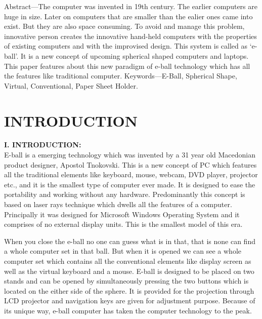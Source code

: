 \documentclass{article}
\begin{document}
Abstract—The computer was invented in 19th century. The earlier computers are huge in size. Later on computers that are smaller than the ealier ones came into exist. But they are also space consuming. To avoid and manage this problem, innovative person creates the innovative hand-held computers with the properties of existing computers and with the improvised design.  This system is called as ‘e-ball’. It is a new concept of upcoming spherical shaped computers and laptops. This paper features about this new paradigm of e-ball technology which has all the features like traditional computer. Keywords—E-Ball, Spherical Shape, Virtual, Conventional, Paper Sheet Holder.\\

\newpage
\section{INTRODUCTION}
 
\textbf{I. INTRODUCTION: }\\


E-ball is  a emerging  technology which was invented 
by  a  31  year  old  Macedonian  product  designer,  Apostol 
Tnokovski. This is a new concept of PC which features all the 
traditional  elements  like  keyboard,  mouse,  webcam,  DVD 
player, projector  etc., and  it is the  smallest type  of computer 
ever made. It  is designed  to ease  the portability  and working 
without any hardware. Predominantly this concept is based on 
laser rays technique which dwells all the features of a computer. 
Principally it was  designed for  Microsoft Windows Operating 
System and it comprises of no external display units. This is the 
smallest model of this era.
 
When you close the e-ball no one can guess what is in 
that, that is none can find a whole computer set in that ball. But 
when  it  is  opened  we  can  see  a  whole  computer  set  which 
contains  all  the conventional  elements  like display  screen  as 
well as the virtual keyboard and a mouse. 
E-ball is designed to be placed on two stands and can 
be opened by simultaneously pressing the two buttons which is 
located on the  either side of the  sphere. It is provided  for the 
projection through LCD projector and navigation keys are given 
for  adjustment  purpose.  Because  of  its  unique  way,  e-ball 
computer has taken the computer technology to the peak.
\\
\end{document}
